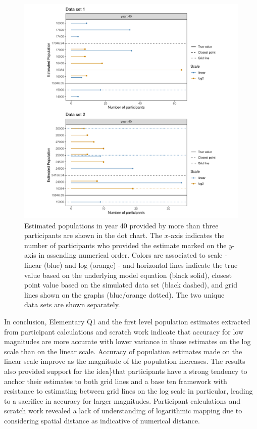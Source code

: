 \documentclass[print]{nuthesis}
\begin{document}
\begin{figure}[tbp]

{\centering \includegraphics[width=1\linewidth,]{thesis_files/figure-latex/common-population-estimates-1} 

}

\caption[Estimated population: common responses for year 40]{Estimated populations in year 40 provided by more than three participants are shown in the dot chart. The $x$-axis indicates the number of participants who provided the estimate marked on the $y$-axis in assending numerical order. Colors are associated to scale - linear (blue) and log (orange) - and horizontal lines indicate the true value based on the underlying model equation (black solid), closest point value based on the simulated data set (black dashed), and grid lines shown on the graphs (blue/orange dotted). The two unique data sets are shown separately.}\label{fig:common-population-estimates}
\end{figure}

In conclusion, Elementary Q1 and the first level population estimates extracted from participant calculations and scratch work indicate that accuracy for low magnitudes are more accurate with lower variance in those estimates on the log scale than on the linear scale.
Accuracy of population estimates made on the linear scale improve as the magnitude of the population increases.
The results also provided support for the idea\}that participants have a strong tendency to anchor their estimates to both grid lines and a base ten framework with resistance to estimating between grid lines on the log scale in particular, leading to a sacrifice in accuracy for larger magnitudes.
Participant calculations and scratch work revealed a lack of understanding of logarithmic mapping due to considering spatial distance as indicative of numerical distance.
\end{document}
